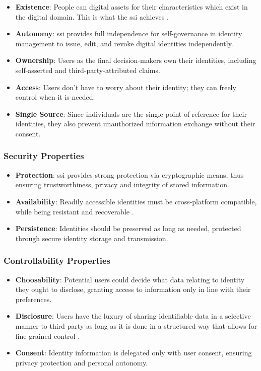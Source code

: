 \begin{itemize}
    \item \textbf{Existence}: People can digital assets for their characteristics which exist in the digital domain. This is what the \gls{ssi} achieves \cite{9869618}.
    \item \textbf{Autonomy}: \gls{ssi} provides full independence for self-governance in identity management to issue, edit, and revoke digital identities independently.
    \item \textbf{Ownership}: Users as the final decision-makers own their identities, including self-asserted and third-party-attributed claims.
    \item \textbf{Access}: Users don't have to worry about their identity; they can freely control when it is needed.
    \item \textbf{Single Source}: Since individuals are the single point of reference for their identities, they also prevent unauthorized information exchange without their consent.
\end{itemize}

\subsubsection{Security Properties}

\begin{itemize}
    \item \textbf{Protection}: \gls{ssi} provides strong protection via cryptographic means, thus ensuring trustworthiness, privacy and integrity of stored information.
    \item \textbf{Availability}: Readily accessible identities must be cross-platform compatible, while being resistant and recoverable \cite{9869618}.
    \item \textbf{Persistence}: Identities should be preserved as long as needed, protected through secure identity storage and transmission.
\end{itemize}

\subsubsection{Controllability Properties}

\begin{itemize}
    \item \textbf{Choosability}: Potential users could decide what data relating to identity they ought to disclose, granting access to information only in line with their preferences.
    \item \textbf{Disclosure}: Users have the luxury of sharing identifiable data in a selective manner to third party as long as it is done in a structured way that allows
    for fine-grained control \cite{9869618}.
    \item \textbf{Consent}: Identity information is delegated only with user consent, ensuring privacy protection and personal autonomy.
\end{itemize}

